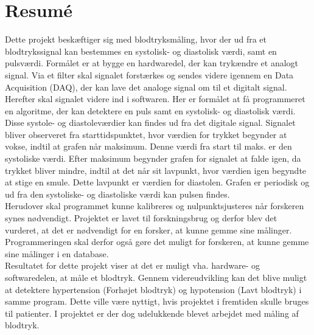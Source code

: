 \chapter{Resumé}
Dette projekt beskæftiger sig med blodtryksmåling, hvor der ud fra et blodtrykssignal kan bestemmes en systolisk- og diastolisk værdi, samt en pulsværdi. Formålet er at bygge en hardwaredel, der kan trykændre et analogt signal. Via et filter skal signalet forstærkes og sendes videre igennem en Data Acquisition (DAQ), der kan lave det analoge signal om til et digitalt signal. Herefter skal signalet videre ind i softwaren. Her er formålet at få programmeret en algoritme, der kan detektere en puls samt en systolisk- og diastolisk værdi. Disse systole- og diastoleværdier kan findes ud fra det digitale signal. Signalet bliver observeret fra starttidspunktet, hvor værdien for trykket begynder at vokse, indtil at grafen når maksimum. Denne værdi fra start til maks. er den systoliske værdi. Efter maksimum begynder grafen for signalet at falde igen, da trykket bliver mindre, indtil at det når sit lavpunkt, hvor værdien igen begyndte at stige en smule. Dette lavpunkt er værdien for diastolen. Grafen er periodisk og ud fra den systoliske- og diastoliske værdi kan pulsen findes. \\
Herudover skal programmet kunne kalibreres og nulpunktsjusteres når forskeren synes nødvendigt. Projektet er lavet til forskningsbrug og derfor blev det vurderet, at det er nødvendigt for en forsker, at kunne gemme sine målinger. Programmeringen skal derfor også gøre det muligt for forskeren, at kunne gemme sine målinger i en database.  \\
Resultatet for dette projekt viser at det er muligt vha. hardware- og softwaredelen, at måle et blodtryk. Gennem videreudvikling kan det blive muligt at detektere hypertension (Forhøjet blodtryk) og hypotension (Lavt blodtryk) i samme program. Dette ville være nyttigt, hvis projektet i fremtiden skulle bruges til patienter. I projektet er der dog udelukkende blevet arbejdet med måling af blodtryk.
